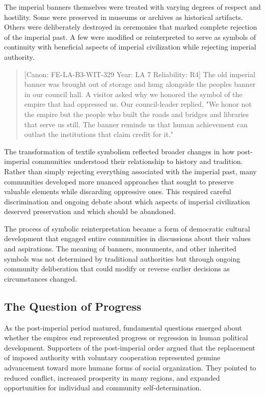 The imperial banners themselves were treated with varying degrees of
respect and hostility. Some were preserved in museums or archives as
historical artifacts. Others were deliberately destroyed in ceremonies
that marked complete rejection of the imperial past. A few were modified
or reinterpreted to serve as symbols of continuity with beneficial
aspects of imperial civilization while rejecting imperial authority.

\begin{quote}
{[}Canon: FE-LA-B3-WIT-329 \textbar{} Year: LA 7 \textbar{} Reliability:
R4{]} The old imperial banner was brought out of storage and hung
alongside the people\textquotesingle s banner in our council hall. A
visitor asked why we honored the symbol of the empire that had oppressed
us. Our council-leader replied, "We honor not the empire but the people
who built the roads and bridges and libraries that serve us still. The
banner reminds us that human achievement can outlast the institutions
that claim credit for it."
\end{quote}

The transformation of textile symbolism reflected broader changes in how
post-imperial communities understood their relationship to history and
tradition. Rather than simply rejecting everything associated with the
imperial past, many communities developed more nuanced approaches that
sought to preserve valuable elements while discarding oppressive ones.
This required careful discrimination and ongoing debate about which
aspects of imperial civilization deserved preservation and which should
be abandoned.

The process of symbolic reinterpretation became a form of democratic
cultural development that engaged entire communities in discussions
about their values and aspirations. The meaning of banners, monuments,
and other inherited symbols was not determined by traditional
authorities but through ongoing community deliberation that could modify
or reverse earlier decisions as circumstances changed.

\subsection{The Question of Progress}\label{the-question-of-progress}

As the post-imperial period matured, fundamental questions emerged about
whether the empire\textquotesingle s end represented progress or
regression in human political development. Supporters of the
post-imperial order argued that the replacement of imposed authority
with voluntary cooperation represented genuine advancement toward more
humane forms of social organization. They pointed to reduced conflict,
increased prosperity in many regions, and expanded opportunities for
individual and community self-determination.

